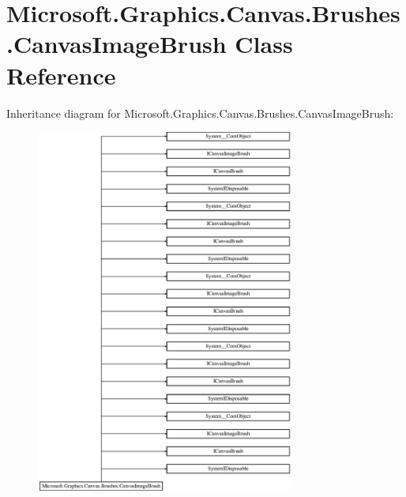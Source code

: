 \hypertarget{class_microsoft_1_1_graphics_1_1_canvas_1_1_brushes_1_1_canvas_image_brush}{}\section{Microsoft.\+Graphics.\+Canvas.\+Brushes.\+Canvas\+Image\+Brush Class Reference}
\label{class_microsoft_1_1_graphics_1_1_canvas_1_1_brushes_1_1_canvas_image_brush}
Inheritance diagram for Microsoft.\+Graphics.\+Canvas.\+Brushes.\+Canvas\+Image\+Brush\+:\begin{figure}[H]
\begin{center}
\leavevmode
\includegraphics[height=12.000000cm]{class_microsoft_1_1_graphics_1_1_canvas_1_1_brushes_1_1_canvas_image_brush}
\end{center}
\end{figure}

